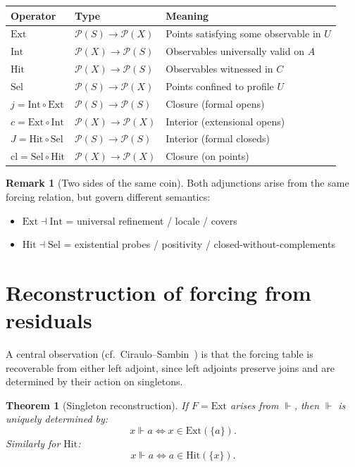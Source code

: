 \documentclass[11pt]{article}
\theoremstyle{definition}
\newtheorem{remark}[definition]{Remark}
\theoremstyle{plain}
\newtheorem{theorem}[definition]{Theorem}
\newcommand{\Pow}{\mathcal P}
\newcommand{\Ext}{\mathrm{Ext}}
\newcommand{\Intt}{\mathrm{Int}}
\newcommand{\Hit}{\mathrm{Hit}}
\newcommand{\Sel}{\mathrm{Sel}}
\newcommand{\cl}{\mathrm{cl}}
\newcommand{\forces}{\Vdash}
\begin{document}
\begin{center}
\begin{tabular}{lll}
\toprule
\textbf{Operator} & \textbf{Type} & \textbf{Meaning} \\
\midrule
$\Ext$ & $\Pow(S) \to \Pow(X)$ & Points satisfying some observable in $U$ \\
$\Intt$ & $\Pow(X) \to \Pow(S)$ & Observables universally valid on $A$ \\
$\Hit$ & $\Pow(X) \to \Pow(S)$ & Observables witnessed in $C$ \\
$\Sel$ & $\Pow(S) \to \Pow(X)$ & Points confined to profile $U$ \\
\midrule
$j = \Intt \circ \Ext$ & $\Pow(S) \to \Pow(S)$ & Closure (formal opens) \\
$c = \Ext \circ \Intt$ & $\Pow(X) \to \Pow(X)$ & Interior (extensional opens) \\
$J = \Hit \circ \Sel$ & $\Pow(S) \to \Pow(S)$ & Interior (formal closeds) \\
$\cl = \Sel \circ \Hit$ & $\Pow(X) \to \Pow(X)$ & Closure (on points) \\
\bottomrule
\end{tabular}
\end{center}

\begin{remark}[Two sides of the same coin]
Both adjunctions arise from the same forcing relation, but govern different semantics:
\begin{itemize}
\item $\Ext\dashv\Intt$ = universal refinement / locale / covers
\item $\Hit\dashv\Sel$ = existential probes / positivity / closed-without-complements
\end{itemize}
\end{remark}

\section{Reconstruction of forcing from residuals}

A central observation (cf.\ Ciraulo--Sambin~\cite{CirauloSambin2012}) is that the forcing table is recoverable from either left adjoint,
since left adjoints preserve joins and are determined by their action on singletons.

\begin{theorem}[Singleton reconstruction]
If $F=\Ext$ arises from $\forces$, then $\forces$ is uniquely determined by:
\[
x\forces a \Longleftrightarrow x\in \Ext(\{a\}).
\]
Similarly for $\Hit$:
\[
x\forces a \Longleftrightarrow a\in \Hit(\{x\}).
\]
\end{theorem}
\end{document}
